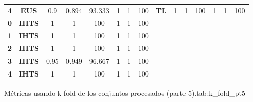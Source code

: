 {{\begin{tabular}{c|c|cccccc|ccccccc}
\textbf{4} & \textbf{EUS} & 0.9   & 0.894 & 93.333 & 1     & 1     & 100   & \multicolumn{1}{c|}{\textbf{TL}} & 1     & 1     & 100   & 1     & 1     & 100 \\
\textbf{0} & \textbf{IHTS} & 1     & 1     & 100   & 1     & 1     & 100   &       &       &       &       &       &       &  \\
\textbf{1} & \textbf{IHTS} & 1     & 1     & 100   & 1     & 1     & 100   &       &       &       &       &       &       &  \\
\textbf{2} & \textbf{IHTS} & 1     & 1     & 100   & 1     & 1     & 100   &       &       &       &       &       &       &  \\
\textbf{3} & \textbf{IHTS} & 0.95  & 0.949 & 96.667 & 1     & 1     & 100   &       &       &       &       &       &       &  \\
\textbf{4} & \textbf{IHTS} & 1     & 1     & 100   & 1     & 1     & 100   &       &       &       &       &       &       &  \\
\end{tabular}}}{Métricas usando k-fold de los conjuntos procesados (parte 5).}{tab:k_fold_pt5}

